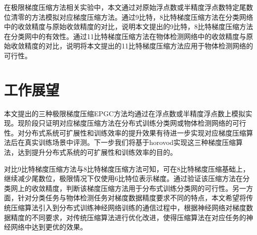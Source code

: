 在极限梯度压缩方法相关实验中，本文通过对原始浮点数或半精度浮点数特定尾数位清零的方法模拟对应梯度压缩方法。通过9比特，8比特梯度压缩方法在分类网络中的收敛精度与原始收敛精度的对比，说明本文提出的9比特，8比特梯度压缩方法在分类网中的有效性。通过11比特梯度压缩方法在物体检测网络中的收敛精度与原始收敛精度的对比，说明将本文提出的11比特梯度压缩方法应用于物体检测网络的可行性。 
\section{工作展望}
本文提出的三种极限梯度压缩EPGC方法均通过在浮点数或半精度浮点数上模拟实现。现阶段只证明对应梯度压缩方法在分布式训练分类网或物体检测网络的可行性。对分布式系统可扩展性和训练效率的提升效果有待进一步实现对应梯度压缩算法后在真实训练场景中评测。下一步我们将基于horovod实现这三种梯度压缩算法，达到提升分布式系统的可扩展性和训练效率的目的。

对比9比特梯度压缩方法与8比特梯度压缩方法可知，可在8比特梯度压缩基础上，继续减少尾数位，极限情况下仅使用6比特位表示梯度。通过验证该压缩方法在分类网上的收敛精度，判断该梯度压缩方法用于分布式训练分类网的可行性。另一方面，针对分类任务与物体检测任务对梯度数据精度要求不同的特点，本文希望将传统压缩算法引入到分布式训练神经网络训练的通信过程中，根据神经网络对梯度数据精度的不同要求，对传统压缩算法进行优化改进，使得压缩算法在对应任务的神经网络中达到更优的效果。

